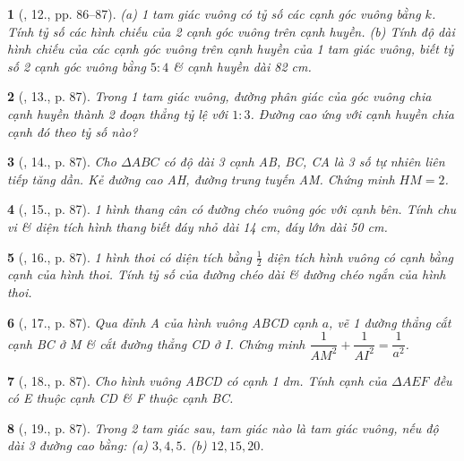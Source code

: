 \documentclass{article}
\newtheorem{baitoan}{}
\begin{document}
\begin{baitoan}[\cite{Binh_Toan_9_tap_1}, 12., pp. 86--87]
	(a) 1 tam giác vuông có tỷ số các cạnh góc vuông bằng $k$. Tính tỷ số các hình chiếu của 2 cạnh góc vuông trên cạnh huyền. (b) Tính độ dài hình chiếu của các cạnh góc vuông trên cạnh huyền của 1 tam giác vuông, biết tỷ số 2 cạnh góc vuông bằng $5:4$ \& cạnh huyền dài {\rm82 cm}.
\end{baitoan}

\begin{baitoan}[\cite{Binh_Toan_9_tap_1}, 13., p. 87]
	Trong 1 tam giác vuông, đường phân giác của góc vuông chia cạnh huyền thành 2 đoạn thẳng tỷ lệ với $1:3$. Đường cao ứng với cạnh huyền chia cạnh đó theo tỷ số nào?
\end{baitoan}

\begin{baitoan}[\cite{Binh_Toan_9_tap_1}, 14., p. 87]
	Cho $\Delta ABC$ có độ dài 3 cạnh AB, BC, CA là 3 số tự nhiên liên tiếp tăng dần. Kẻ đường cao AH, đường trung tuyến AM. Chứng minh $HM = 2$.
\end{baitoan}

\begin{baitoan}[\cite{Binh_Toan_9_tap_1}, 15., p. 87]
	1 hình thang cân có đường chéo vuông góc với cạnh bên. Tính chu vi \& diện tích hình thang biết đáy nhỏ dài {\rm14 cm}, đáy lớn dài {\rm50 cm}.
\end{baitoan}

\begin{baitoan}[\cite{Binh_Toan_9_tap_1}, 16., p. 87]
	1 hình thoi có diện tích bằng $\frac{1}{2}$ diện tích hình vuông có cạnh bằng cạnh của hình thoi. Tính tỷ số của đường chéo dài \& đường chéo ngắn của hình thoi.
\end{baitoan}

\begin{baitoan}[\cite{Binh_Toan_9_tap_1}, 17., p. 87]
	Qua đỉnh A của hình vuông ABCD cạnh $a$, vẽ 1 đường thẳng cắt cạnh BC ở M \& cắt đường thẳng CD ở I. Chứng minh $\dfrac{1}{AM^2} + \dfrac{1}{AI^2} = \dfrac{1}{a^2}$.
\end{baitoan}

\begin{baitoan}[\cite{Binh_Toan_9_tap_1}, 18., p. 87]
	Cho hình vuông ABCD có cạnh {\rm1 dm}. Tính cạnh của $\Delta AEF$ đều có E thuộc cạnh CD \& F thuộc cạnh BC.
\end{baitoan}

\begin{baitoan}[\cite{Binh_Toan_9_tap_1}, 19., p. 87]
	Trong 2 tam giác sau, tam giác nào là tam giác vuông, nếu độ dài 3 đường cao bằng: (a) $3,4,5$. (b) $12,15,20$.
\end{baitoan}
\end{document}

